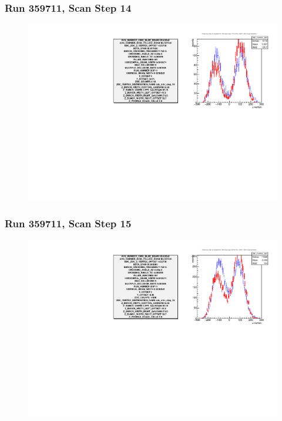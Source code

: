 \begin{frame}
\frametitle{Run 359711, Scan Step 14}
\begin{figure}
\begin{center}
\includegraphics[width=\linewidth]{"figures/359711_step_14_zdc_zvertex"}
\caption{ }
\label{fig:359711_step_14_zdc_zvertex}
\end{center}\end{figure}
\end{frame}

\begin{frame}
\frametitle{Run 359711, Scan Step 15}
\begin{figure}
\begin{center}
\includegraphics[width=\linewidth]{"figures/359711_step_15_zdc_zvertex"}
\caption{ }
\label{fig:359711_step_15_zdc_zvertex}
\end{center}\end{figure}
\end{frame}

